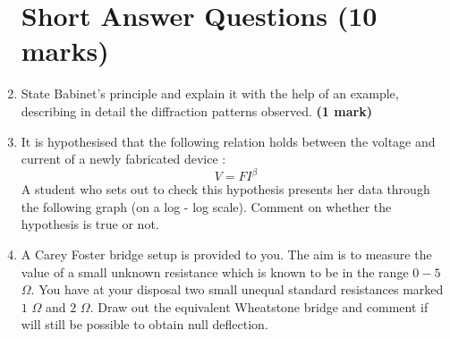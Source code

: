 \begin{enumerate}
\newpage





\renewcommand{\figurename}{Figure}

\section*{Short Answer Questions \hfill (10 marks)}



\item State Babinet's principle and explain it with the help of an example, describing in detail the diffraction patterns observed.  \hfill \textbf{(1 mark)}

\item It is hypothesised that the following relation holds between the voltage and current of a newly fabricated device :
$$ V = FI^{\beta}               $$
A student who sets out to check this hypothesis presents her data through the following graph (on a log - log scale). Comment on whether the hypothesis is true or not. 

\item A Carey Foster bridge setup is provided to you. The aim is to measure the value of a small unknown resistance which is known to be in the range $0-5$ $\Omega$. You have at your disposal two small unequal standard resistances marked $1$ $\Omega$ and $2$ $\Omega$. Draw out the equivalent Wheatstone bridge and comment if will still be possible to obtain null deflection.


\end{enumerate}
